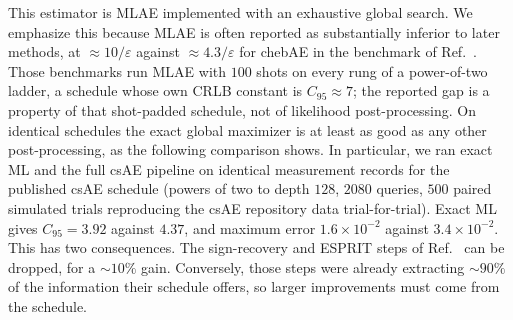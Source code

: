 \documentclass[%
 twocolumn,
 amsmath,amssymb,
prx,
longbibliography
]{revtex4-2}
\begin{document}
This estimator is MLAE \cite{suzuki2020amplitude} implemented with an exhaustive global search. We emphasize this because MLAE is often reported as substantially inferior to later methods, at $\approx 10/\varepsilon$ against $\approx 4.3/\varepsilon$ for chebAE in the benchmark of Ref.~\cite{Rall2023amplitudeestimation}. Those benchmarks run MLAE with $100$ shots on every rung of a power-of-two ladder, a schedule whose own \ac{CRLB} constant is $C_{95} \approx 7$; the reported gap is a property of that shot-padded schedule, not of likelihood post-processing. On identical schedules the exact global maximizer is at least as good as any other post-processing, as the following comparison shows. In particular, we ran exact \ac{ML} and the full csAE pipeline on identical measurement records for the published csAE schedule (powers of two to depth $128$, $2080$ queries, $500$ paired simulated trials reproducing the csAE repository data trial-for-trial). Exact \ac{ML} gives $C_{95} = 3.92$ against $4.37$, and maximum error $1.6\times 10^{-2}$ against $3.4\times 10^{-2}$. This has two consequences. The sign-recovery and ESPRIT steps of Ref.~\cite{labib2024csae} can be dropped, for a $\sim 10\%$ gain. Conversely, those steps were already extracting $\sim 90\%$ of the information their schedule offers, so larger improvements must come from the schedule.
\end{document}

